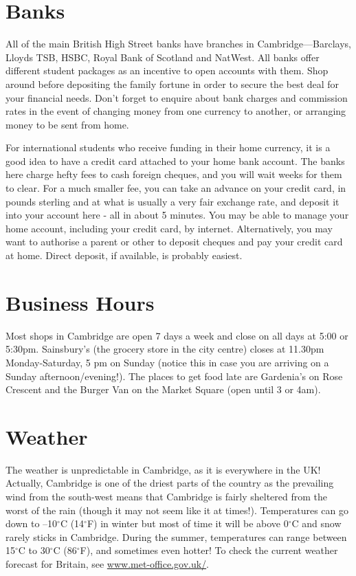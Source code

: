 \documentclass[11pt,fleqn, oneside]{book} %
\begin{document}
\section{Banks}
    
All of the main British High Street banks have branches in Cambridge—Barclays, Lloyds TSB, HSBC, Royal Bank of Scotland and NatWest. All banks offer different student packages as an incentive to open accounts with them. Shop around before depositing the family fortune in order to secure the best deal for your financial needs. Don't forget to enquire about bank charges and commission rates in the event of changing money from one currency to another, or arranging money to be sent from home.
    
For international students who receive funding in their home currency, it is a good idea to have a credit card attached to your home bank account. The banks here charge hefty fees to cash foreign cheques, and you will wait weeks for them to clear. For a much smaller fee, you can take an advance on your credit card, in pounds sterling and at what is usually a very fair exchange rate, and deposit it into your account here - all in about 5 minutes. You may be able to manage your home account, including your credit card, by internet. Alternatively, you may want to authorise a parent or other to deposit cheques and pay your credit card at home. Direct deposit, if available, is probably easiest. 
    
\section{Business Hours}
    
Most shops in Cambridge are open 7 days a week and close on all days at 5:00 or 5:30pm.  Sainsbury’s (the grocery store in the city centre) closes at 11.30pm Monday-Saturday, 5 pm on Sunday (notice this in case you are arriving on a Sunday afternoon/evening!).  The places to get food late are Gardenia's on Rose Crescent and the Burger Van on the Market Square (open until 3 or 4am). 
    
\section{Weather}
    
The weather is unpredictable in Cambridge, as it is everywhere in the UK!  Actually, Cambridge is one of the driest parts of the country as the prevailing wind from the south-west means that Cambridge is fairly sheltered from the worst of the rain (though it may not seem like it at times!).  Temperatures can go down to –10$^\circ$C  (14$^\circ$F) in winter but most of time it will be above 0$^\circ$C and snow rarely sticks in Cambridge.  During the summer, temperatures can range between 15$^\circ$C to 30$^\circ$C (86$^\circ$F), and sometimes even hotter!  
To check the current weather forecast for Britain, see \url{www.met-office.gov.uk/}. 
 
\end{document}
